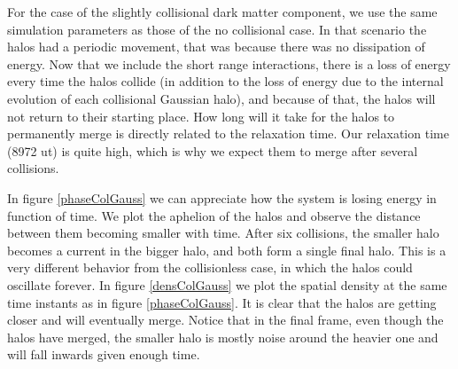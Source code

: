 For the case of the slightly collisional dark matter component, we use the same simulation parameters as those of the no collisional case.
In that scenario the halos had a periodic movement, that was because there was no dissipation of energy.
Now that we include the short range interactions, there is a loss of energy every time the halos collide (in addition to the loss of energy due to the internal evolution of each collisional Gaussian halo), and because of that, the halos will not return to their starting place. How long will it take for the halos to permanently merge is directly related to the relaxation time. Our relaxation time (8972 ut) is quite high, which is why we expect them to merge after several collisions.

In figure \ref{phaseColGauss} we can appreciate how the system is losing energy in function of time.
We plot the aphelion of the halos and observe the distance between them becoming smaller with time. After six collisions, the smaller halo becomes a current in the bigger halo, and both form a single final halo. This is a very different behavior from the collisionless case, in which the halos could oscillate forever.
In figure \ref{densColGauss} we plot the spatial density at the same time instants as in figure \ref{phaseColGauss}. It is clear that the halos are getting closer and will eventually merge. Notice that in the final frame, even though the halos have merged, the smaller halo is mostly noise around the heavier one and will fall inwards given enough time.

